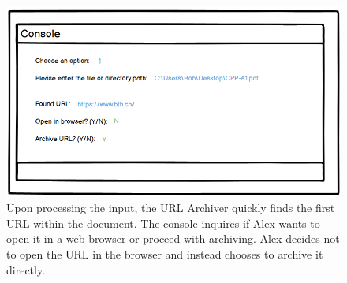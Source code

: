\begin{figure}[h!]
    \centering
    \includegraphics[width=1\textwidth]{pictures/Story Board/StoryBoard_3}
    \caption{Upon processing the input, the URL Archiver quickly finds the first URL within the document. The console inquires if Alex wants to open it in a web browser or proceed with archiving. Alex decides not to open the URL in the browser and instead chooses to archive it directly.}
    \label{fig:StoryBoard_3}
\end{figure}
\clearpage

